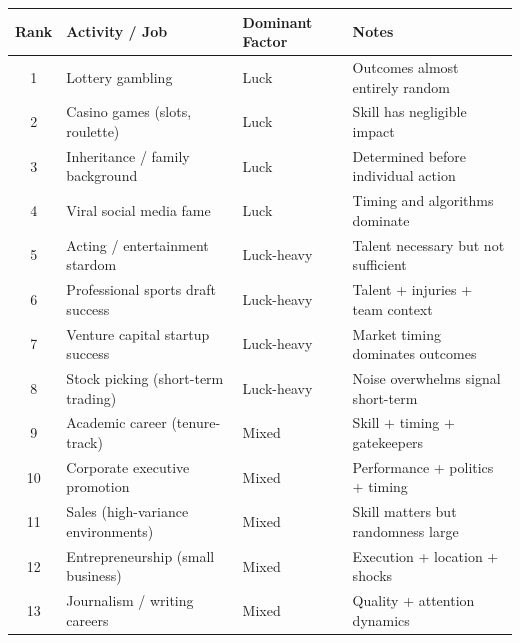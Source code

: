 \begin{table}[H]
  \centering
  \small
  \begin{tabular}{clll}
    \toprule \textbf{Rank} & \textbf{Activity / Job}               & \textbf{Dominant Factor} & \textbf{Notes}                              \\
    \midrule 1             & Lottery gambling                      & Luck                     & Outcomes almost entirely random             \\
    2                      & Casino games (slots, roulette)        & Luck                     & Skill has negligible impact                 \\
    3                      & Inheritance / family background       & Luck                     & Determined before individual action         \\
    4                      & Viral social media fame               & Luck                     & Timing and algorithms dominate              \\
    5                      & Acting / entertainment stardom        & Luck-heavy               & Talent necessary but not sufficient         \\
    6                      & Professional sports draft success     & Luck-heavy               & Talent + injuries + team context            \\
    7                      & Venture capital startup success       & Luck-heavy               & Market timing dominates outcomes            \\
    8                      & Stock picking (short-term trading)    & Luck-heavy               & Noise overwhelms signal short-term          \\
    9                      & Academic career (tenure-track)        & Mixed                    & Skill + timing + gatekeepers                \\
    10                     & Corporate executive promotion         & Mixed                    & Performance + politics + timing             \\
    11                     & Sales (high-variance environments)    & Mixed                    & Skill matters but randomness large          \\
    12                     & Entrepreneurship (small business)     & Mixed                    & Execution + location + shocks               \\
    13                     & Journalism / writing careers          & Mixed                    & Quality + attention dynamics                \\

\end{tabular}
\end{table}
